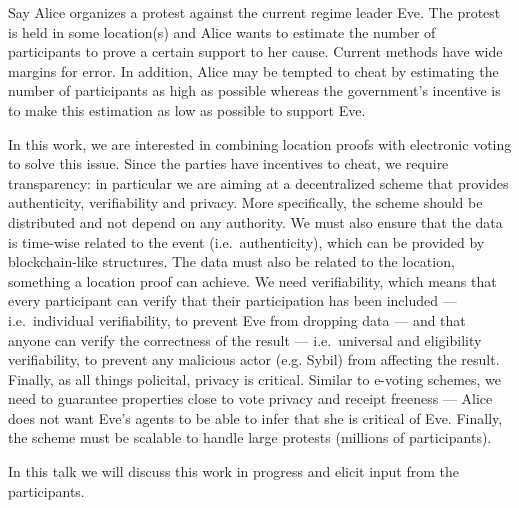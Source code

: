Say Alice organizes a protest against the current regime leader Eve.
The protest is held in some location(s) and Alice wants to estimate the number 
of participants to prove a certain support to her cause.
Current methods have wide margins for error.
In addition, Alice may be tempted to cheat by estimating the number of 
participants as high as possible whereas the government's incentive is to make 
this estimation as low as possible to support Eve.
                                                                                  
In this work, we are interested in combining location proofs with electronic 
voting to solve this issue.
Since the parties have incentives to cheat, we require transparency: in 
particular we are aiming at a decentralized scheme that provides authenticity, 
verifiability and privacy.
More specifically, the scheme should be distributed and not depend on any 
authority.
We must also ensure that the data is time-wise related to the event (i.e.\ 
authenticity), which can be provided by blockchain-like structures.
The data must also be related to the location, something a location proof can 
achieve.
We need verifiability, which means that every participant can verify that their 
participation has been included --- i.e.\ individual verifiability, to prevent 
Eve from dropping data --- and that anyone can verify the correctness of the 
result --- i.e.\ universal and eligibility verifiability, to prevent any 
malicious actor (e.g. Sybil) from affecting the result.
Finally, as all things policital, privacy is critical.
Similar to e-voting schemes, we need to guarantee properties close to vote 
privacy and receipt freeness --- Alice does not want Eve's agents to be able to 
infer that she is critical of Eve.
Finally, the scheme must be scalable to handle large protests (millions of 
participants).

In this talk we will discuss this work in progress and elicit input from the
participants.

